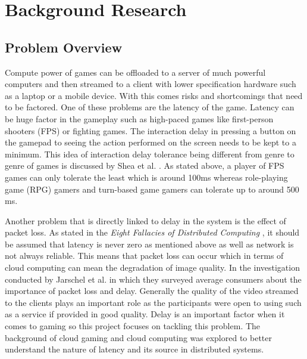 \chapter{Background Research}
\label{chapter2}

\section{Problem Overview}
Compute power of games can be offloaded to a server of much powerful computers and then streamed to a client with lower specification hardware such as a laptop or a mobile device. With this comes risks and shortcomings that need to be factored. One of these problems are the latency of the game. Latency can be huge factor in the gameplay such as high-paced games like first-person shooters (FPS) or fighting games. The interaction delay in pressing a button on the gamepad to seeing the action performed on the screen needs to be kept to a minimum. This idea of interaction delay tolerance being different from genre to genre of games is discussed by Shea et al. \cite{shea2013cloud}. As stated above, a player of FPS games can only tolerate the least which is around 100ms whereas role-playing game (RPG) gamers and turn-based game gamers can tolerate up to around 500 ms.
\newline
\par
Another problem that is directly linked to delay in the system is the effect of packet loss. As stated in the \textit{Eight Fallacies of Distributed Computing} \cite{deutsch1994eight}, it should be assumed that latency is never zero as mentioned above as well as network is not always reliable. This means that packet loss can occur which in terms of cloud computing can mean the degradation of image quality. In the investigation conducted by Jarschel et al. \cite{jarschel2011evaluation} in which they surveyed average consumers about the importance of packet loss and delay. Generally the quality of the video streamed to the clients plays an important role as the participants were open to using such as a service if provided in good quality. Delay is an important factor when it comes to gaming so this project focuses on tackling this problem. The background of cloud gaming and cloud computing was explored to better understand the nature of latency and its source in distributed systems.

